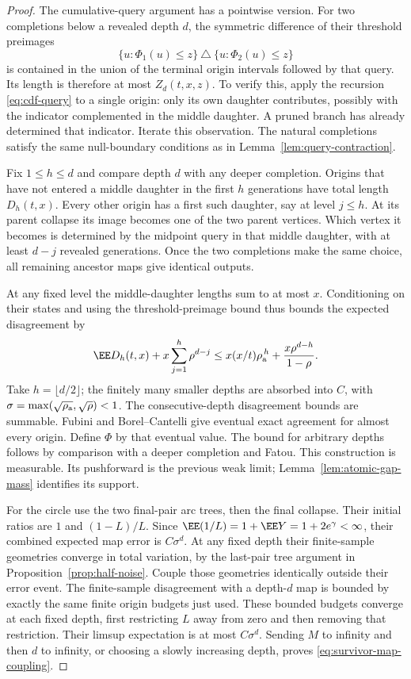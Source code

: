 \documentclass[11pt,letterpaper]{article}
\begin{document}
\begin{proof}
The cumulative-query argument has a pointwise version. For two
completions below a revealed depth $d$, the symmetric difference
of their threshold preimages
\[
 \{u:\Phi_1(u)\le z\}\ \triangle\ \{u:\Phi_2(u)\le z\}
\]
is contained in the union of the terminal origin intervals followed
by that query. Its length is therefore at most $Z_d(t,x,z)$.
To verify this, apply the recursion \eqref{eq:cdf-query} to a
single origin: only its own daughter contributes, possibly with
the indicator complemented in the middle daughter. A pruned
branch has already determined that indicator. Iterate this
observation. The natural completions satisfy the same null-boundary
conditions as in Lemma~\ref{lem:query-contraction}.

Fix $1\le h\le d$ and compare depth $d$ with any deeper completion.
Origins that have not entered a middle daughter in the first $h$
generations have total length $D_h(t,x)$.
Every other origin has a first such daughter, say at level $j\le h$.
At its parent collapse its image becomes one of the two parent
vertices. Which vertex it becomes is determined by the midpoint
query in that middle daughter, with at least $d-j$ revealed
generations. Once the two completions make the same choice, all
remaining ancestor maps give identical outputs.

At any fixed level the middle-daughter lengths sum to at most $x$.
Conditioning on their states and using the threshold-preimage
bound thus bounds the expected disagreement by
\[
 \EE D_h(t,x)+x\sum_{j=1}^h\rho^{d-j}
 \le x(x/t)\rho_{\rm a}^{\,h}
                   +\frac{x\rho^{d-h}}{1-\rho}.
\]
Take $h=\lfloor d/2\rfloor$; the finitely many smaller depths are
absorbed into $C$, with
$\sigma=\max(\sqrt{\rho_{\rm a}},\sqrt\rho)<1$.
The consecutive-depth disagreement bounds are summable.
Fubini and Borel--Cantelli give eventual exact agreement for almost
every origin.
Define $\Phi$ by that eventual value. The bound for arbitrary
depths follows by comparison with a deeper completion and Fatou.
This construction is measurable. Its pushforward is the previous
weak limit; Lemma~\ref{lem:atomic-gap-mass} identifies its support.

For the circle use the two final-pair arc trees, then the final
collapse. Their initial ratios are $1$ and $(1-L)/L$.
Since $\EE(1/L)=1+\EE Y=1+2e^\gamma<\infty$, their combined expected
map error is $C\sigma^d$. At any fixed depth their finite-sample
geometries converge in total variation, by the last-pair tree
argument in Proposition~\ref{prop:half-noise}. Couple those
geometries identically outside their error event.
The finite-sample disagreement with a depth-$d$ map is bounded
by exactly the same finite origin budgets just used. These bounded
budgets converge at each fixed depth, first restricting $L$ away
from zero and then removing that restriction. Their limsup
expectation is at most $C\sigma^d$.
Sending $M$ to infinity and then $d$ to infinity, or choosing a
slowly increasing depth, proves \eqref{eq:survivor-map-coupling}.
\end{proof}
\end{document}
